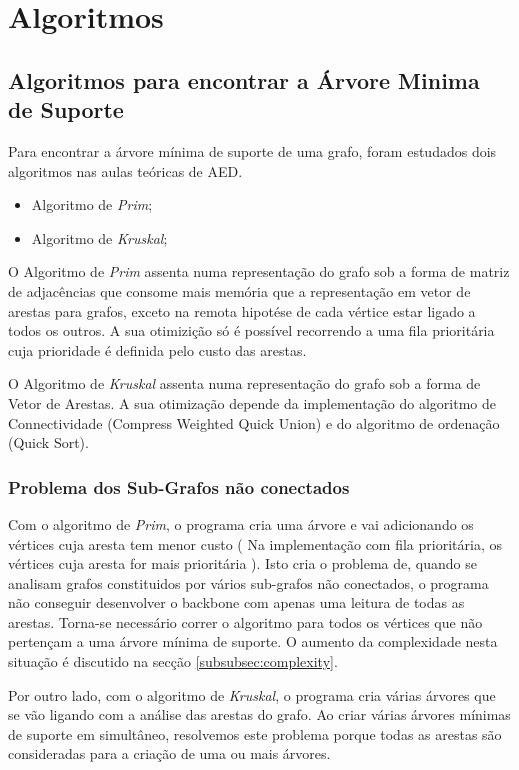 \documentclass[14pt]{article}
\begin{document}
    \newpage
    \section[Algoritmos]{Algoritmos}\label{sec:algoritmos}
    \subsection[mstfind]{Algoritmos para encontrar a Árvore Minima de Suporte}\label{subsec:mstfind}
    Para encontrar a árvore mínima de suporte de uma grafo, foram estudados dois algoritmos nas aulas teóricas de AED.
    \begin{itemize}
        \item Algoritmo de \emph{Prim};
        \item Algoritmo de \emph{Kruskal};
    \end{itemize}

    O Algoritmo de \emph{Prim} assenta numa representação do grafo sob a forma de matriz de adjacências que consome mais memória que a
    representação em vetor de arestas para grafos, exceto na remota hipotése de cada vértice estar ligado a todos os outros.
    A sua otimizição só é possível recorrendo a uma fila prioritária cuja prioridade é definida pelo custo das arestas.

    O Algoritmo de \emph{Kruskal} assenta numa representação do grafo sob a forma de Vetor de Arestas. A sua otimização depende
    da implementação do algoritmo de Connectividade (Compress Weighted Quick Union) e do algoritmo de ordenação (Quick Sort).

    \subsubsection[subgraphpb]{Problema dos Sub-Grafos não conectados}\label{subsubsec:subgraphpb}
    Com o algoritmo de \emph{Prim}, o programa cria uma árvore e vai adicionando os vértices cuja aresta tem menor custo ( Na implementação com
    fila prioritária, os vértices cuja aresta for mais prioritária ). Isto cria o problema de, quando se analisam grafos constituidos por
    vários sub-grafos não conectados, o programa não conseguir desenvolver o backbone com apenas uma leitura de todas as arestas. Torna-se
    necessário correr o algoritmo para todos os vértices que não pertençam a uma árvore mínima de suporte. O aumento da complexidade nesta
    situação é discutido na secção \ref{subsubsec:complexity}.

    Por outro lado, com o algoritmo de \emph{Kruskal}, o programa cria várias árvores que se vão ligando com a análise das arestas do grafo. Ao criar
    várias árvores mínimas de suporte em simultâneo, resolvemos este problema porque todas as arestas são consideradas para a criação de uma ou
    mais árvores.
    
\end{document}
